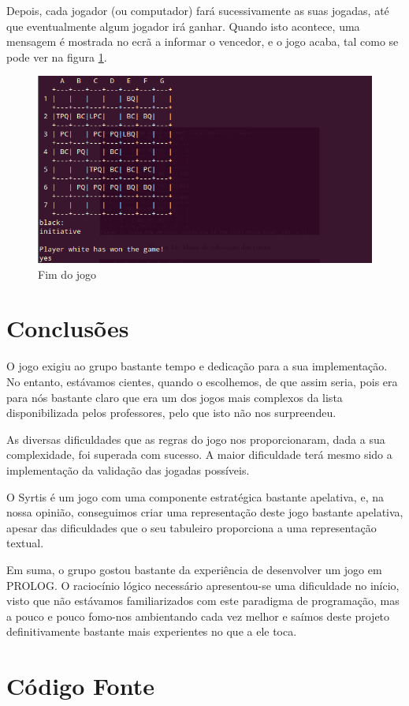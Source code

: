 \documentclass[a4paper]{article}
\begin{document}
Depois, cada jogador (ou computador) fará sucessivamente as suas jogadas, até que eventualmente algum jogador irá ganhar. Quando isto acontece, uma mensagem é mostrada no ecrã a informar o vencedor, e o jogo acaba, tal como se pode ver na figura \ref{fig:endgame}.

\begin{figure}[h]
\centering
\includegraphics[scale=0.5]{gameend.jpg}
\caption{Fim do jogo}
\label{fig:endgame}
\end{figure}


\newpage
\section{Conclusões}
O jogo exigiu ao grupo bastante tempo e dedicação para a sua implementação. No entanto, estávamos cientes, quando o escolhemos, de que assim seria, pois era para nós bastante claro que era um dos jogos mais complexos da lista disponibilizada pelos professores, pelo que isto não nos surpreendeu.

As diversas dificuldades que as regras do jogo nos proporcionaram, dada a sua complexidade, foi superada com sucesso. A maior dificuldade terá mesmo sido a implementação da validação das jogadas possíveis.

O Syrtis é um jogo com uma componente estratégica bastante apelativa, e, na nossa opinião, conseguimos criar uma representação deste jogo bastante apelativa, apesar das dificuldades que o seu tabuleiro proporciona a uma representação textual.

Em suma, o grupo gostou bastante da experiência de desenvolver um jogo em PROLOG. O raciocínio lógico necessário apresentou-se uma dificuldade no início, visto que não estávamos familiarizados com este paradigma de programação, mas a pouco e pouco fomo-nos ambientando cada vez melhor e saímos deste projeto definitivamente bastante mais experientes no que a ele toca.


\clearpage
{}
\renewcommand\refname{Bibliografia}



\newpage
\appendix
\section{Código Fonte}

\end{document}
